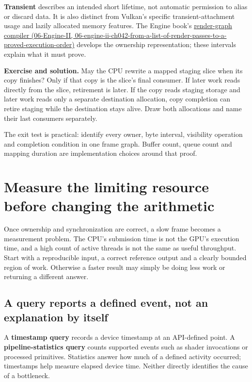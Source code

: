 \textbf{Transient} describes an intended short lifetime, not automatic permission to alias or discard data. It is also distinct from Vulkan's specific transient-attachment usage and lazily allocated memory features. The Engine book's \href{../06-Engine-II/main.pdf\#nameddest=06-engine-ii-ch042-from-a-list-of-render-passes-to-a-proved-execution-order}{render-graph compiler (06-Engine-II, 06-engine-ii-ch042-from-a-list-of-render-passes-to-a-proved-execution-order)} develops the ownership representation; these intervals explain what it must prove.

\textbf{Exercise and solution.} May the CPU rewrite a mapped staging slice when its copy finishes? Only if that copy is the slice's final consumer. If later work reads directly from the slice, retirement is later. If the copy reads staging storage and later work reads only a separate destination allocation, copy completion can retire staging while the destination stays alive. Draw both allocations and name their last consumers separately.

The exit test is practical: identify every owner, byte interval, visibility operation and completion condition in one frame graph. Buffer count, queue count and mapping duration are implementation choices around that proof.

\section{Measure the limiting resource before changing the arithmetic}\label{03-visual-computing-i-ch016-measure-the-limiting-resource-before-changing-the-arithmetic}

Once ownership and synchronization are correct, a slow frame becomes a measurement problem. The CPU's submission time is not the GPU's execution time, and a high count of active threads is not the same as useful throughput. Start with a reproducible input, a correct reference output and a clearly bounded region of work. Otherwise a faster result may simply be doing less work or returning a different answer.

\subsection{A query reports a defined event, not an explanation by itself}\label{03-visual-computing-i-ch016-a-query-reports-a-defined-event-not-an-explanation-by-itself}

A \textbf{timestamp query} records a device timestamp at an API-defined point. A \textbf{pipeline-statistics query} counts supported events such as shader invocations or processed primitives. Statistics answer how much of a defined activity occurred; timestamps help measure elapsed device time. Neither directly identifies the cause of a bottleneck.

